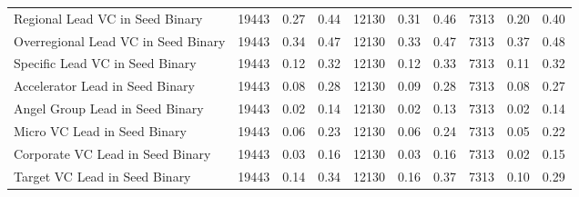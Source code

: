 {\begin{table}[!h]
{\begin{tabular}[t]{lrrrrrrrrr}
Regional Lead VC in Seed Binary & 19443 & 0.27 & 0.44 & 12130 & 0.31 & 0.46 & 7313 & 0.20 & 0.40\\
Overregional Lead VC in Seed Binary & 19443 & 0.34 & 0.47 & 12130 & 0.33 & 0.47 & 7313 & 0.37 & 0.48\\
Specific Lead VC in Seed Binary & 19443 & 0.12 & 0.32 & 12130 & 0.12 & 0.33 & 7313 & 0.11 & 0.32\\
Accelerator Lead in Seed Binary & 19443 & 0.08 & 0.28 & 12130 & 0.09 & 0.28 & 7313 & 0.08 & 0.27\\
\addlinespace
Angel Group Lead in Seed Binary & 19443 & 0.02 & 0.14 & 12130 & 0.02 & 0.13 & 7313 & 0.02 & 0.14\\
Micro VC Lead in Seed Binary & 19443 & 0.06 & 0.23 & 12130 & 0.06 & 0.24 & 7313 & 0.05 & 0.22\\
Corporate VC Lead in Seed Binary & 19443 & 0.03 & 0.16 & 12130 & 0.03 & 0.16 & 7313 & 0.02 & 0.15\\
Target VC Lead in Seed Binary & 19443 & 0.14 & 0.34 & 12130 & 0.16 & 0.37 & 7313 & 0.10 & 0.29\\
\bottomrule
\end{tabular}}
\end{table}
}
